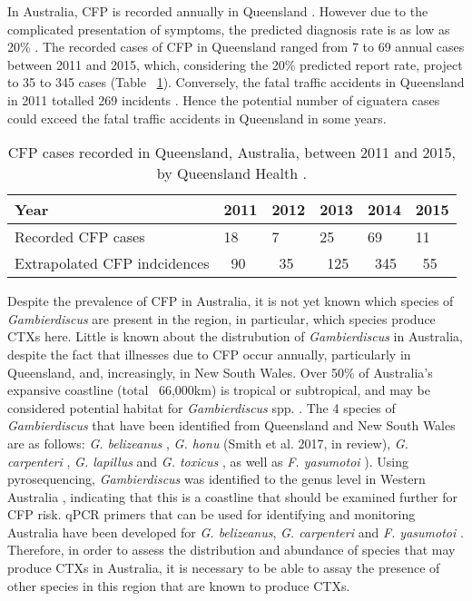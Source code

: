 \documentclass[12pt]{article}
\begin{document}
In Australia, CFP is recorded annually in Queensland \cite{qldcig}. However due to the complicated presentation of symptoms, the predicted diagnosis rate is as low as 20\% \citep{lewis2006ciguatera}. The recorded cases of CFP in Queensland ranged from 7 to 69 annual cases between 2011 and 2015, which, considering the 20\% predicted report rate, project to 35 to 345 cases (Table ~\ref{tbl:CFPTable}). Conversely, the fatal traffic accidents in Queensland in 2011 totalled 269 incidents \cite{qldtraffic}. Hence the potential number of ciguatera cases could exceed the fatal traffic accidents in Queensland in some years. 
\FloatBarrier
\begin{table}
\caption{CFP cases recorded in Queensland, Australia, between 2011 and 2015, by Queensland Health \cite{qldcig}.}
\label{tbl:CFPTable}
\begin{tabular}{ | p{6cm} | p{1.5cm} | p{1.5cm}| p{1.5cm} | p{1.5cm} | p{1.5cm} | }
\hline
Year &2011&2012&2013&2014&2015\\
\hline
Recorded CFP cases&18&7&25&69&11\\
\hline
Extrapolated CFP indcidences&~90&~35&~125&~345&~55\\
\hline
\end{tabular}
\end{table}
\FloatBarrier
Despite the prevalence of CFP in Australia, it is not yet known which species of \textit{Gambierdiscus} are present in the region, in particular, which species produce CTXs here. Little is known about the distrubution of \emph{Gambierdiscus} in Australia, despite the fact that illnesses due to CFP occur annually, particularly in Queensland, and, increasingly, in New South Wales.
Over 50\% of Australia's expansive coastline (total ~66,000km) is tropical or subtropical, and may be considered potential habitat for \emph{Gambierdiscus} spp. \cite{kretzschmar2016characterization}. 
The 4 species of \emph{Gambierdiscus} that have been identified from Queensland and New South Wales are as follows: \emph{G. belizeanus} \citep{murray2014molecular}, \emph{G. honu} (Smith et al. 2017, in review), \emph{G. carpenteri} \citep{kohli2014high}, \emph{G. lapillus} \cite{kretzschmar2016characterization} and \emph{G. toxicus} \citep{hallegraeff2010algae}, as well as \emph{F. yasumotoi}  \citep{murray2014molecular}). Using pyrosequencing, \textit{Gambierdiscus} was identified to the genus level in Western Australia \citep{kohli2014cob}, indicating that this is a coastline that should be examined further for CFP risk. 
qPCR primers that can be used for identifying and monitoring Australia have been developed for \emph{G. belizeanus}, \emph{G. carpenteri} and \emph{F. yasumotoi} \citep{nishimura2016quantitative,vandersea2012development}. Therefore, in order to assess the distribution and abundance of species that may produce CTXs in Australia, it is necessary to be able to assay the presence of other species in this region that are known to produce CTXs.\\ 
\end{document}
